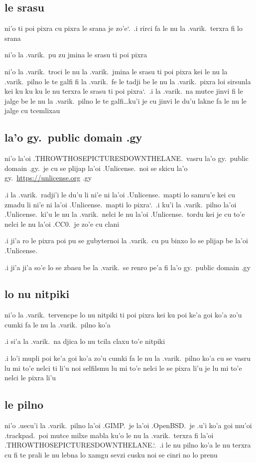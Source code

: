 \documentclass{report}
\newcommand\sds{\spacefactor\sfcode`.\ \space}
\begin{document}
\subsection{le srasu}
ni'o ti poi pixra cu pixra le srana je zo'e\sds  .i rirci fa le nu la .varik.\ terxra fi lo srana

ni'o la .varik.\ pu zu jmina le srasu ti poi pixra

ni'o la .varik.\ troci le nu la .varik.\ jmina le srasu ti poi pixra kei le nu la .varik.\ pilno le te galfi fi la .varik.\ fe le tadji be le nu la .varik.\ pixra loi sirsunla kei ku ku ku le nu terxra le srasu ti poi pixra\sds  .i la .varik.\ na mutce jinvi fi le jalge be le nu la .varik.\ pilno le te galfi\ldots ku'i je cu jinvi le du'u lakne fa le nu le jalge cu tcemlixau

\subsection{la'o gy.\ public domain .gy}
ni'o la'oi .THROWTHOSEPICTURESDOWNTHELANE.\ vasru la'o gy.\ public domain .gy.\ je cu se plijap la'oi .Unlicense.\ noi se skicu la'o gy.\ \url{https://unlicense.org} .gy

.i la .varik.\ radji'i le du'u li ni'e ni la'oi .Unlicense.\ mapti lo samru'e kei cu zmadu li ni'e ni la'oi .Unlicense.\ mapti lo pixra\sds  .i ku'i la .varik.\ pilno la'oi .Unlicense.\ ki'u le nu la .varik.\ nelci le nu la'oi .Unlicense.\ tordu kei je cu to'e nelci le nu la'oi .CC0.\ je zo'e cu clani

.i ji'a ro le pixra poi pu se gubyternoi la .varik.\ cu pu binxo lo se plijap be la'oi .Unlicense.

.i ji'a ji'a so'e lo se zbasu be la .varik.\ se renro pe'a fi la'o gy.\ public domain .gy

\subsection{lo nu nitpiki}
ni'o la .varik.\ tervencpe lo nu nitpiki ti poi pixra kei ku poi ke'a goi ko'a zo'u cumki fa le nu la .varik.\ pilno ko'a

.i si'a la .varik.\ na djica lo nu tcila claxu to'e nitpiki

.i lo'i mupli poi ke'a goi ko'a zo'u cumki fa le nu la .varik.\ pilno ko'a cu se vasru lu mi to'e nelci ti li'u noi selfilsmu lu mi to'e nelci le se pixra li'u je lu mi to'e nelci le pixra li'u

\subsection{le pilno}
ni'o .uecu'i la .varik.\ pilno la'oi .GIMP.\ je la'oi .OpenBSD.\ je .u'i ko'a goi mu'oi .trackpad.\ poi mutce milxe mabla ku'o le nu la .varik.\ terxra fi la'oi .THROWTHOSEPICTURESDOWNTHELANE.\sds  .i le nu pilno ko'a le nu terxra cu fi te prali le nu lebna lo xamgu sevzi cusku noi se cinri no lo prenu
\end{document}
